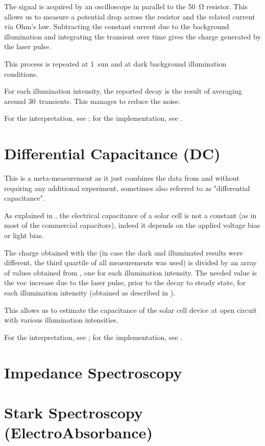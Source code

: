 The signal is acquired by an oscilloscope in parallel to the \SI{50}{\ohm} resistor. This allows us to measure a potential drop across the resistor and the related current via Ohm's law. Subtracting the constant current due to the background illumination and integrating the transient over time gives the charge generated by the laser pulse.

This process is repeated at 1~sun and at dark background illumination conditions.

For each illumination intensity, the reported decay is the result of averaging around 30~transients. This manages to reduce the noise.

For the interpretation, see ; for the implementation, see .

\section{Differential Capacitance (DC)}

This is a meta-measurement as it just combines the data from  and  without requiring any additional experiment\cite{Shuttle2008}, sometimes also referred to as "differential capacitance".

As explained in , the electrical capacitance of a solar cell is not a constant (as in most of the commercial capacitors), indeed it depends on the applied voltage bias or light bias.

The charge obtained with the  (in case the dark and illuminated results were different, the third quartile of all  measurements was used) is divided by an array of values obtained from , one for each illumination intensity. The needed value is the \gls{voc} increase due to the laser pulse, prior to the decay to steady state, for each illumination intensity (obtained as described in ).

This allows us to estimate the capacitance of the solar cell device at open circuit with various illumination intensities.

For the interpretation, see ; for the implementation, see .

\section{Impedance Spectroscopy}

\section{Stark Spectroscopy (ElectroAbsorbance)}

